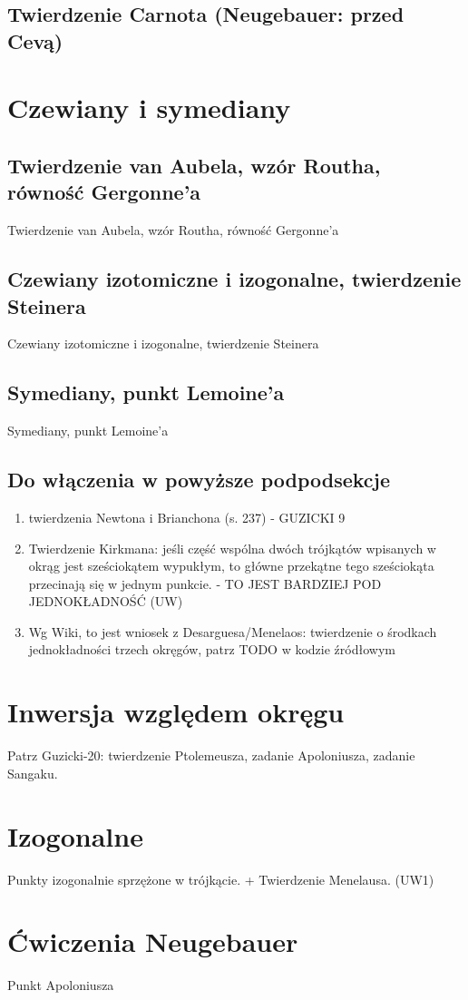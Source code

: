 \subsection{Twierdzenie Carnota (Neugebauer: przed Cevą)}


\section{Czewiany i symediany}
\subsection{Twierdzenie van Aubela, wzór Routha, równość Gergonne'a}
Twierdzenie van Aubela, wzór Routha, równość Gergonne'a

\subsection{Czewiany izotomiczne i izogonalne, twierdzenie Steinera}
Czewiany izotomiczne i izogonalne, twierdzenie Steinera

\subsection{Symediany, punkt Lemoine'a}
Symediany, punkt Lemoine'a

\subsection{Do włączenia w powyższe podpodsekcje}
\begin{enumerate}
    \item twierdzenia Newtona i Brianchona (s. 237) - GUZICKI 9
    \item Twierdzenie Kirkmana: jeśli część wspólna dwóch trójkątów wpisanych w okrąg jest sześciokątem wypukłym, to główne przekątne tego sześciokąta przecinają się w jednym punkcie. - TO JEST BARDZIEJ POD JEDNOKŁADNOŚĆ (UW)
    \item Wg Wiki, to jest wniosek z Desarguesa/Menelaos: twierdzenie o środkach jednokładności trzech okręgów, patrz TODO w kodzie źródłowym %
\end{enumerate}

\section{Inwersja względem okręgu}
Patrz Guzicki-20: twierdzenie Ptolemeusza, zadanie Apoloniusza, zadanie Sangaku.


\section{Izogonalne}
Punkty izogonalnie sprzężone w trójkącie. + Twierdzenie Menelausa. (UW1)

\section{Ćwiczenia Neugebauer}
Punkt Apoloniusza





%